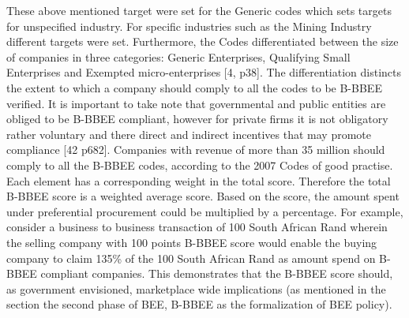 These above mentioned target were set for the Generic codes which sets targets for unspecified industry. For specific industries such as the Mining Industry different targets were set. Furthermore, the Codes differentiated between the size of companies in three categories: Generic Enterprises, Qualifying Small Enterprises and Exempted micro-enterprises [4, p38]. The differentiation distincts the extent to which a company should comply to all the codes to be B-BBEE verified. It is important to take note that governmental and public entities are obliged to be B-BBEE compliant, however for private firms it is not obligatory rather voluntary and there direct and indirect incentives that may promote compliance [42 p682].  Companies with revenue of more than 35 million should comply to all the B-BBEE codes, according to the 2007 Codes of good practise. Each element has a corresponding weight in the total score. Therefore the total B-BBEE score is a weighted average score. Based on the score, the amount spent under preferential procurement could be multiplied by a percentage. For example, consider a business to business transaction of 100 South African Rand wherein the selling company with 100 points B-BBEE score would enable the buying company to claim 135\% of the 100 South African Rand as amount spend on B-BBEE compliant companies. This demonstrates that the B-BBEE score should, as government envisioned, marketplace wide implications (as mentioned in the section the second phase of BEE, B-BBEE as the formalization of BEE policy).
